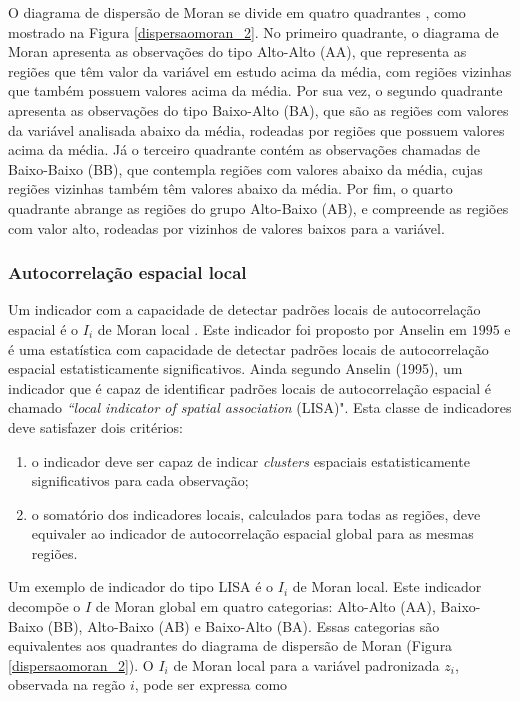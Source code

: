 \documentclass[12pt,a4paper]{article}
\begin{document}
O diagrama de dispersão de Moran se divide em quatro quadrantes , como mostrado na Figura \ref{dispersaomoran_2}. No primeiro quadrante, o diagrama de Moran apresenta as observações do tipo Alto-Alto (AA), que representa as regiões que têm valor da variável em estudo acima da média, com regiões vizinhas que também possuem valores acima da média. Por sua vez, o segundo quadrante apresenta as observações do tipo Baixo-Alto (BA), que são as regiões com valores da variável analisada abaixo da média, rodeadas por regiões que possuem valores acima da média. Já o terceiro quadrante contém as observações chamadas de Baixo-Baixo (BB), que contempla regiões com valores abaixo da média, cujas regiões vizinhas também têm valores abaixo da média. Por fim, o quarto quadrante abrange as regiões do grupo  Alto-Baixo (AB), e compreende as regiões com valor alto, rodeadas por vizinhos de valores baixos para a variável.

\subsubsection{Autocorrelação espacial local}
	
Um indicador com a capacidade de detectar padrões locais de autocorrelação espacial é o $I_i$ de Moran local \cite{almeida12_g}. Este indicador foi proposto por Anselin em $1995$ e é uma estatística com capacidade de detectar padrões locais de autocorrelação espacial estatisticamente significativos. Ainda segundo Anselin (1995), um indicador que é capaz de identificar padrões locais de autocorrelação espacial é chamado \textit{``local indicator of spatial association} (LISA)". Esta classe de indicadores deve satisfazer dois critérios: 


\begin{enumerate}[leftmargin=1.8cm, label=\alph*)]
    \item o indicador deve ser capaz de indicar \textit{clusters} espaciais estatisticamente significativos para cada observação;
	\item o somatório dos indicadores locais, calculados para todas as regiões, deve equivaler ao indicador de autocorrelação espacial global para as mesmas regiões.
\end{enumerate}


Um exemplo de indicador do tipo LISA é o $I_i$ de Moran local. Este indicador decompõe o $I$ de Moran global em quatro categorias: Alto-Alto (AA), Baixo-Baixo (BB), Alto-Baixo (AB) e  Baixo-Alto (BA). Essas categorias são equivalentes aos quadrantes do diagrama de dispersão de Moran (Figura \ref{dispersaomoran_2}). O $I_i$ de Moran local para a variável padronizada $z_i$, observada na regão $i$, pode ser expressa como 
	
\end{document}
